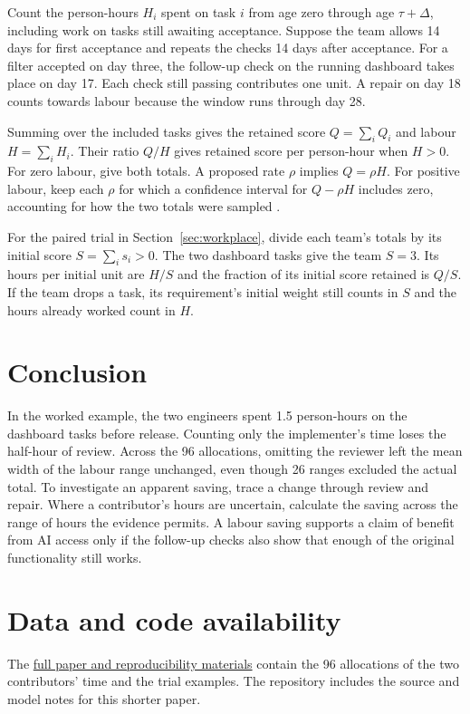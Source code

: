 \documentclass[12pt,a4paper]{amsart}
\begin{document}
Count the person-hours $H_i$ spent on task $i$ from age zero through age $\tau+\Delta$, including work on tasks still awaiting acceptance. Suppose the team allows 14 days for first acceptance and repeats the checks 14 days after acceptance. For a filter accepted on day three, the follow-up check on the running dashboard takes place on day 17. Each check still passing contributes one unit. A repair on day 18 counts towards labour because the window runs through day 28.

Summing over the included tasks gives the retained score $Q=\sum_i Q_i$ and labour $H=\sum_i H_i$. Their ratio $Q/H$ gives retained score per person-hour when $H>0$. For zero labour, give both totals. A proposed rate $\rho$ implies $Q=\rho H$. For positive labour, keep each $\rho$ for which a confidence interval for $Q-\rho H$ includes zero, accounting for how the two totals were sampled \cite{vonluxburg2009}.

For the paired trial in Section~\ref{sec:workplace}, divide each team's totals by its initial score $S=\sum_i s_i>0$. The two dashboard tasks give the team $S=3$. Its hours per initial unit are $H/S$ and the fraction of its initial score retained is $Q/S$. If the team drops a task, its requirement's initial weight still counts in $S$ and the hours already worked count in $H$.






\section{Conclusion}

In the worked example, the two engineers spent 1.5 person-hours on the dashboard tasks before release. Counting only the implementer's time loses the half-hour of review. Across the 96 allocations, omitting the reviewer left the mean width of the labour range unchanged, even though 26 ranges excluded the actual total. To investigate an apparent saving, trace a change through review and repair. Where a contributor's hours are uncertain, calculate the saving across the range of hours the evidence permits. A labour saving supports a claim of benefit from AI access only if the follow-up checks also show that enough of the original functionality still works.

\section*{Data and code availability}

The \href{https://github.com/emmett08/engineering-work-observatory/tree/4847fee965041b1a6ac7cf26b317a9c9c9181722/paper}{full paper and reproducibility materials} contain the 96 allocations of the two contributors' time and the trial examples. The repository includes the source and model notes for this shorter paper.



\end{document}
